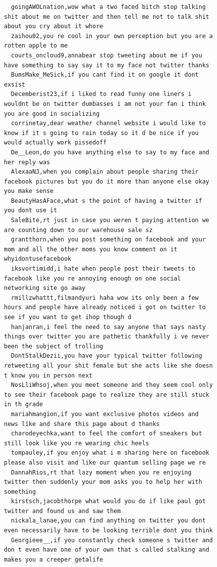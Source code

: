 \begin{figure}[htpb]
\begin{verbatim}
  goingAWOLnation,wow what a two faced bitch stop talking shit about me on twitter and then tell me not to talk shit about you cry about it whore
  zaihou02,you re cool in your own perception but you are a rotten apple to me
  courts_oncloud9,annabear stop tweeting about me if you have something to say say it to my face not twitter thanks
  BumsMake_MeSick,if you cant find it on google it dont exsist
  Decemberist23,if i liked to read funny one liners i wouldnt be on twitter dumbasses i am not your fan i think you are good in socializing
  corrinetay,dear weather channel website i would like to know if it s going to rain today so it d be nice if you would actually work pissedoff
  De__Leon,do you have anything else to say to my face and her reply was
  AlexaaNJ,when you complain about people sharing their facebook pictures but you do it more than anyone else okay you make sense
  BeautyHasAFace,what s the point of having a twitter if you dont use it
  SaleBite,rt just in case you weren t paying attention we are counting down to our warehouse sale sz
  grantthorn,when you post something on facebook and your mom and all the other moms you know comment on it whyidontusefacebook
  iksvortimidd,i hate when people post their tweets to facebook like you re annoying enough on one social networking site go away
  rmillzwhattt,filmandyuri haha wow its only been a few hours and people have already noticed i got on twitter to see if you want to get ihop though d
  hanjanran,i feel the need to say anyone that says nasty things over twitter you are pathetic thankfully i ve never been the subject of trolling
  DontStalkDezii,you have your typical twitter following retweeting all your shit female but she acts like she doesn t know you in person next
  NosLliWhsoj,when you meet someone and they seem cool only to see their facebook page to realize they are still stuck in th grade
  mariahmangion,if you want exclusive photos videos and news like and share this page about d thanks
  charodeyechka,want to feel the comfort of sneakers but still look like you re wearing chic heels
  tompauley,if you enjoy what i m sharing here on facebook please also visit and like our quantum selling page we re
  DannahRios,rt that lazy moment when you re enjoying twitter then suddenly your mom asks you to help her with something
  kirstsch,jacobthorpe what would you do if like paul got twitter and found us and saw them
  nickala_lanae,you can find anything on twitter you dont even necessarily have to be looking terrible dont you think
  Georgieee__,if you constantly check someone s twitter and don t even have one of your own that s called stalking and makes you a creeper getalife

\end{verbatim}
\end{figure}
